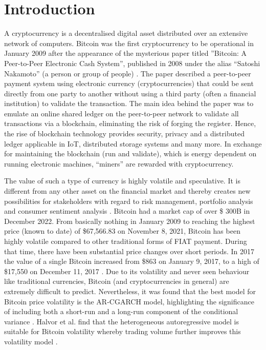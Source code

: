 \chapter{Introduction}
A cryptocurrency is a decentralised digital asset distributed over an extensive network of computers. Bitcoin was the first cryptocurrency to be operational in January 2009 after the appearance of the mysterious paper titled ”Bitcoin: A Peer-to-Peer Electronic Cash System”, published in 2008 under the alias “Satoshi Nakamoto” (a person or group of people) \cite{satoshi2009}. The paper described a peer-to-peer payment system using electronic currency (cryptocurrencies) that could be sent directly from one party to another without using a third party (often a financial institution) to validate the transaction. The main idea behind the paper was to emulate an online shared ledger on the peer-to-peer network to validate all transactions via a blockchain, eliminating the risk of forging the register. Hence, the rise of blockchain technology provides security, privacy and a distributed ledger applicable in IoT, distributed storage systems and many more. In exchange for maintaining the blockchain (run and validate), which is energy dependent on running electronic machines, “miners” are rewarded with cryptocurrency.

\par The value of such a type of currency is highly volatile and speculative. It is different from any other asset on the financial market and thereby creates new possibilities for stakeholders with regard to risk management, portfolio analysis and consumer sentiment analysis \cite{Anne2016}. Bitcoin had a market cap of over \$ 300B in December 2022. From basically nothing in January 2009 to reaching the highest price (known to date) of \$67,566.83 on November 8, 2021, Bitcoin has been highly volatile compared to other traditional forms of FIAT payment. During that time, there have been substantial price changes over short periods. In 2017 the value of a single Bitcoin increased from \$863 on January 9, 2017, to a high of \$17,550 on December 11, 2017 \cite{Abraham2018}. Due to its volatility and never seen behaviour like traditional currencies, Bitcoin (and cryptocurrencies in general) are extremely difficult to predict. Nevertheless, it was found that the best model for Bitcoin price volatility is the AR-CGARCH model, highlighting the significance of including both a short-run and a long-run component of the conditional variance \cite{Paraskevi2017}. Halvor et al. find that the heterogeneous autoregressive model is suitable for Bitcoin volatility whereby trading volume further improves this volatility model \cite{Halvor2019}.

